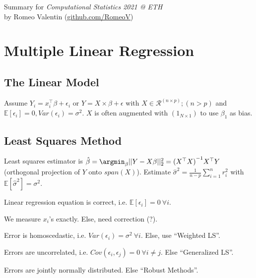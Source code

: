 \noindent Summary for \emph{Computational Statistics 2021 @ ETH}\\
by Romeo Valentin (\url{github.com/RomeoV})
\section{Multiple Linear Regression}\label{sec:multiple_linear_regression}
\subsection{The Linear Model}\label{subsec:the_linear_model}
\begin{sectionbox}\nospacing{}
Assume $Y_i = x_{i}^{\top}\beta + \epsilon_{i}$ or $Y = X \times \beta + \epsilon$ with $X \in \mathcal{R}^{(n \times p)}; (n > p)$ and $\mathbb{E}[\epsilon_{i}]=0, Var(\epsilon_{i}) = \sigma^{2}$.
$X$ is often augmented with $(1_{N\times 1})$ to use $\beta_{1}$ as bias.
\end{sectionbox}
\subsection{Least Squares Method}\label{subsec:least_squares_method}
\begin{sectionbox}\nospacing{}
  Least squares estimator is $\hat \beta = \argmin_{\beta} ||Y - X\beta||^{2}_{2} = {(X^{\top}X)}^{-1} X^{\top}Y$ (orthogonal projection of $Y$ onto $span(X)$).
  Estimate $\hat{\sigma}^{2} = \frac{1}{n-p}\sum_{i=1}^{n}r_{i}^{2}$ with $\mathbb{E}[\hat{\sigma}^{2}] = \sigma^{2}$.
\end{sectionbox}

\begin{notebox}\nospacing{}
    \begin{enumeratenosep}[label=\roman*]
        \item Linear regression equation is correct, i.e. $\mathbb{E}[\epsilon_{i}]=0\ \forall i$.
        \item We measure $x_{i}$'s exactly. Else, need correction (?).
        \item Error is homoscedastic, i.e. $Var(\epsilon_{i})=\sigma^{2}\ \forall i$. Else, use ``Weighted LS''.
        \item Errors are uncorrelated, i.e. $Cov(\epsilon_{i}, \epsilon_{j}) = 0\ \forall i \neq j$. Else ``Generalized LS''.
        \item Errors are jointly normally distributed. Else ``Robust Methods''.
    \end{enumeratenosep}
\end{notebox}

